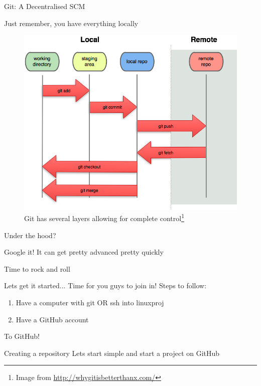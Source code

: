 \documentclass{beamer}
\begin{document}
\begin{frame}{Git: A Decentralised SCM}
    \begin{block}{Just remember, you have everything locally}
    \begin{figure}[ht]
        \centering
        \includegraphics[width=0.6\linewidth]{img/overview.png}
        \caption{Git has several layers allowing for complete control\footnote{Image from \href{http://whygitisbetterthanx.com/}{http://whygitisbetterthanx.com/}}}
        \label{fig:figure0}
    \end{figure}
    \end{block}
\end{frame}

\begin{frame}{Under the hood?}
    \begin{block}{Google it!}
        It can get pretty advanced pretty quickly
    \end{block}
\end{frame}

\begin{frame}{Time to rock and roll}
    \begin{block}{Lets get it started...}
        Time for you guys to join in!
        Steps to follow:
        \begin{enumerate}
            \item Have a computer with git OR ssh into linuxproj
            \item Have a GitHub account
        \end{enumerate}
    \end{block}
\end{frame}
\begin{frame}{To GitHub!}
    \begin{exampleblock}{Creating a repository}
        Lets start simple and start a project on GitHub
    \end{exampleblock}
\end{frame}
\end{document}
